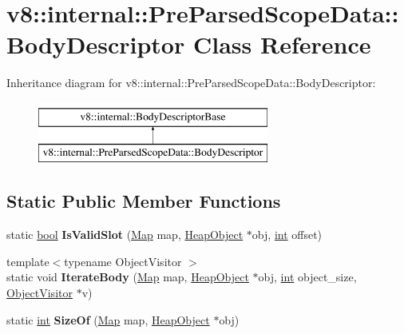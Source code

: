 \hypertarget{classv8_1_1internal_1_1PreParsedScopeData_1_1BodyDescriptor}{}\section{v8\+:\+:internal\+:\+:Pre\+Parsed\+Scope\+Data\+:\+:Body\+Descriptor Class Reference}
\label{classv8_1_1internal_1_1PreParsedScopeData_1_1BodyDescriptor}
Inheritance diagram for v8\+:\+:internal\+:\+:Pre\+Parsed\+Scope\+Data\+:\+:Body\+Descriptor\+:\begin{figure}[H]
\begin{center}
\leavevmode
\includegraphics[height=2.000000cm]{classv8_1_1internal_1_1PreParsedScopeData_1_1BodyDescriptor}
\end{center}
\end{figure}
\subsection*{Static Public Member Functions}
\begin{DoxyCompactItemize}
\item 
\mbox{\label{classv8_1_1internal_1_1PreParsedScopeData_1_1BodyDescriptor_a26b0f24aa8c90204da4262605ac4160d}} 
static \mbox{\hyperlink{classbool}{bool}} {\bfseries Is\+Valid\+Slot} (\mbox{\hyperlink{classv8_1_1internal_1_1Map}{Map}} map, \mbox{\hyperlink{classv8_1_1internal_1_1HeapObject}{Heap\+Object}} $\ast$obj, \mbox{\hyperlink{classint}{int}} offset)
\item 
\mbox{\label{classv8_1_1internal_1_1PreParsedScopeData_1_1BodyDescriptor_ae5757de40a9e5a2e6f9a2034140a067e}} 
{\footnotesize template$<$typename Object\+Visitor $>$ }\\static void {\bfseries Iterate\+Body} (\mbox{\hyperlink{classv8_1_1internal_1_1Map}{Map}} map, \mbox{\hyperlink{classv8_1_1internal_1_1HeapObject}{Heap\+Object}} $\ast$obj, \mbox{\hyperlink{classint}{int}} object\+\_\+size, \mbox{\hyperlink{classv8_1_1internal_1_1ObjectVisitor}{Object\+Visitor}} $\ast$v)
\item 
\mbox{\label{classv8_1_1internal_1_1PreParsedScopeData_1_1BodyDescriptor_a545a2a47a1c2bd0a29be4dde7f63d6b9}} 
static \mbox{\hyperlink{classint}{int}} {\bfseries Size\+Of} (\mbox{\hyperlink{classv8_1_1internal_1_1Map}{Map}} map, \mbox{\hyperlink{classv8_1_1internal_1_1HeapObject}{Heap\+Object}} $\ast$obj)
\end{DoxyCompactItemize}
